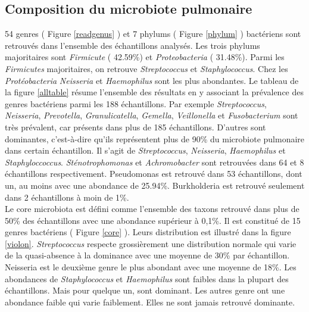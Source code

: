\documentclass[12pt,a4paper]{article}
\begin{document}
\subsection{Composition du microbiote pulmonaire}
54 genres ( Figure \ref{readgenus} ) et 7 phylums ( Figure \ref{phylum} ) bactériens sont retrouvés dans l'ensemble des échantillons analysés. 
Les trois phylums majoritaires sont \textit{Firmicute} ( 42.59\%) et \textit{Proteobacteria} ( 31.48\%). Parmi les \textit{Firmicutes} majoritaires, on retrouve \textit{Streptococcus} et \textit{Staphylococcus}. Chez les \textit{Protéobacteria} \textit{Neisseria} et \textit{Haemophilus} sont les plus abondantes.
Le tableau de la figure \ref{alltable} résume l'ensemble des résultats en y associant la prévalence des genres bactériens parmi les 188 échantillons.
Par exemple \textit{Streptococcus}, \textit{Neisseria}, \textit{Prevotella}, \textit{Granulicatella}, \textit{Gemella}, \textit{Veillonella} et \textit{Fusobacterium} sont très prévalent, car présents dans plus de 185 échantillons.
D’autres sont dominantes, c’est-à-dire qu’ils représentent plus de 90\% du microbiote pulmonaire dans certain échantillon. Il s’agit de \textit{Streptococcus}, \textit{Neisseria}, \textit{Haemophilus} et \textit{Staphyloccoccus}. \textit{Sténotrophomonas} et \textit{Achromobacter} sont retrouvées dans 64 et 8 échantillons respectivement. Pseudomonas est retrouvé dans 53 échantillons, dont un, au moins avec une abondance de 25.94\%. Burkholderia est retrouvé seulement dans 2 échantillons à moin de 1\%.\\
Le core microbiota est défini comme l'ensemble des taxons retrouvé dans plus de 50\% des échantillons avec une abondance supérieur à 0,1\%. Il est constitué de 15 genres bactériens ( Figure \ref{core} ). Leurs distribution est illustré dans la figure \ref{violon}.
\textit{Streptococcus} respecte grossièrement une distribution normale qui varie de la quasi-absence à la dominance avec une moyenne de 30\% par échantillon. Neisseria est le deuxième genre le plus abondant avec une moyenne de 18\%.
Les abondances de \textit{Staphylococcus} et \textit{Haemophilus} sont faibles dans la plupart des échantillons. Mais pour quelque un, sont dominant. Les autres genre ont une abondance faible qui varie faiblement. Elles ne sont jamais retrouvé dominante.
\end{document}
